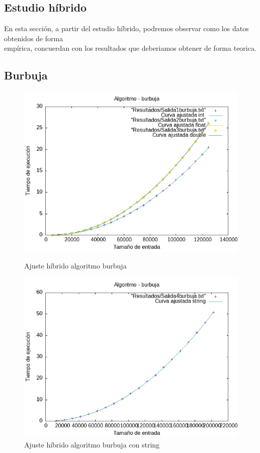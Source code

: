 \documentclass[11pt]{article}
\begin{document}
\subsection{Estudio híbrido}
En esta sección, a partir del estudio híbrido, podremos observar como los datos obtenidos de forma \\
empírica, concuerdan con los resultados que deberiamos obtener de forma teorica.
\subsection*{Burbuja}
\begin{figure}[H]
    \begin{minipage}{0.5\textwidth}
        \centering
        \includegraphics[width=\linewidth]{assets/AjusteHibrido_latex/Hibridoburbuja/burbuja_hib.png}
        \caption{Ajuste híbrido algoritmo burbuja}
        \label{fig:burbuja}
    \end{minipage}%
    \begin{minipage}{0.5\textwidth}
        \centering
        \includegraphics[width=\linewidth]{assets/AjusteHibrido_latex/Hibridoburbuja/burbujastring_hib.png}
        \caption{Ajuste híbrido algoritmo burbuja con string}
        \label{fig:burbujastring}
    \end{minipage}
\end{figure}
\end{document}
